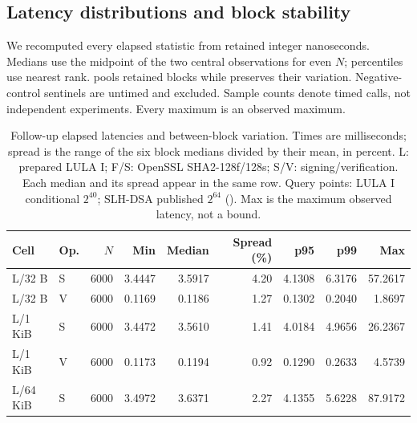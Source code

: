 \subsection{Latency distributions and block stability}
We recomputed every elapsed statistic from retained integer nanoseconds. Medians use the midpoint of the two central observations for even $N$; percentiles use nearest rank.  pools retained blocks while  preserves their variation. Negative-control sentinels are untimed and excluded. Sample counts denote timed calls, not independent experiments. Every maximum is an observed maximum.

\begin{table}[t]
\caption{Follow-up elapsed latencies and between-block variation. Times are milliseconds; spread is the range of the six block medians divided by their mean, in percent. L: prepared LULA I; F/S: OpenSSL SHA2-128f/128s; S/V: signing/verification. Each median and its spread appear in the same row. Query points: LULA I conditional $2^{40}$; SLH-DSA published $2^{64}$ (). Max is the maximum observed latency, not a bound.}\label{tab:stability-latencies}
\centering\small\setlength{\tabcolsep}{2pt}
\begin{tabular}{llrrrrrrr}\toprule
Cell & Op. & $N$ & Min & Median & Spread (\%) & p95 & p99 & Max\\\midrule
L/32 B & S & 6000 & 3.4447 & 3.5917 & 4.20 & 4.1308 & 6.3176 & 57.2617\\
L/32 B & V & 6000 & 0.1169 & 0.1186 & 1.27 & 0.1302 & 0.2040 & 1.8697\\
L/1 KiB & S & 6000 & 3.4472 & 3.5610 & 1.41 & 4.0184 & 4.9656 & 26.2367\\
L/1 KiB & V & 6000 & 0.1173 & 0.1194 & 0.92 & 0.1290 & 0.2633 & 4.5739\\
L/64 KiB & S & 6000 & 3.4972 & 3.6371 & 2.27 & 4.1355 & 5.6228 & 87.9172\\

\end{tabular}
\end{table}
